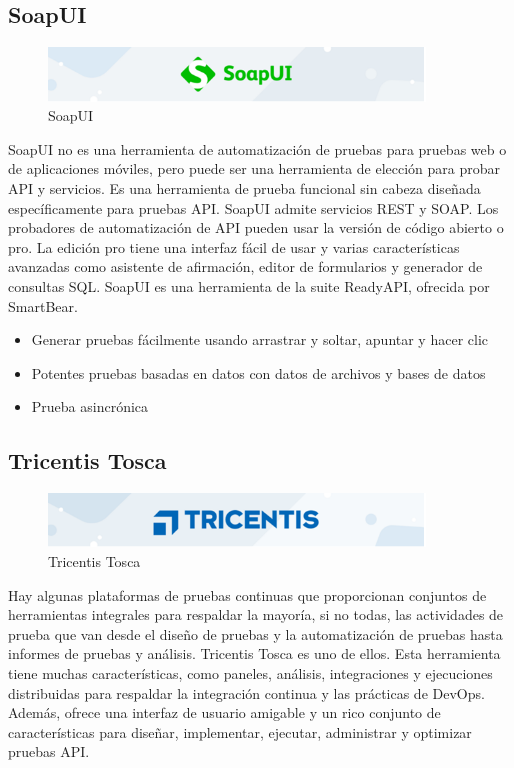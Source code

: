 \documentclass[12pt,letterpaper]{article}
\begin{document}
\subsection{SoapUI}
\begin{figure}[h]
    \begin{center}
    \includegraphics[width=10cm]{./Imagenes/image3.png}
    \caption{SoapUI}
    \label{rg4}
    \end{center}
    \end{figure}
SoapUI no es una herramienta de automatización de pruebas para pruebas web 
o de aplicaciones móviles, pero puede ser una herramienta de elección para probar 
API y servicios. Es una herramienta de prueba funcional sin cabeza diseñada 
específicamente para pruebas API.
SoapUI admite servicios REST y SOAP. Los probadores de automatización de API pueden 
usar la versión de código abierto o pro. La edición pro tiene una interfaz fácil de 
usar y varias características avanzadas como asistente de afirmación, editor de formularios 
y generador de consultas SQL. SoapUI es una herramienta de la suite ReadyAPI, ofrecida por SmartBear.

\begin{itemize}
    \item	Generar pruebas fácilmente usando arrastrar y soltar, apuntar y hacer clic
    \item	Potentes pruebas basadas en datos con datos de archivos y bases de datos
    \item	Prueba asincrónica

\end{itemize}




\subsection{Tricentis Tosca }
\begin{figure}[h]
    \begin{center}
    \includegraphics[width=10cm]{./Imagenes/image4.png}
    \caption{Tricentis Tosca}
    \label{rg5}
    \end{center}
    \end{figure}
Hay algunas plataformas de pruebas continuas que proporcionan conjuntos de herramientas integrales para respaldar la mayoría, si no todas, las actividades de prueba que van desde el diseño de pruebas y la automatización de pruebas hasta informes de pruebas y análisis. Tricentis Tosca es uno de ellos.
Esta herramienta tiene muchas características, como paneles, análisis, integraciones y ejecuciones distribuidas para respaldar la integración continua y las prácticas de DevOps. Además, ofrece una interfaz de usuario amigable y un rico conjunto de características para diseñar, implementar, ejecutar, administrar y optimizar pruebas API.
\end{document}
